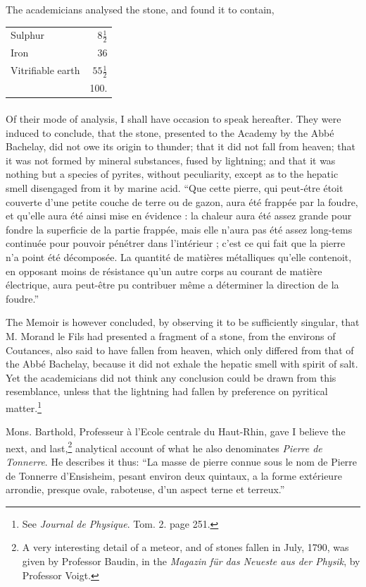 \documentclass[a4paper, 12pt, oneside, twocolumn]{article}
\begin{document}
The academicians analysed the stone, and found it to contain,
\begin{table}[H]
    \centering\bfseries
    \begin{tabular}{l r}
        Sulphur & $8\frac{1}{2}$ \\ 
        Iron & 36 \\
        Vitrifiable earth & $55\frac{1}{2}$ \\ \hline
        ~ & 100. \\
    \end{tabular}
\end{table}
\paragraph{}
Of their mode of analysis, I shall have occasion to speak hereafter. They were induced to conclude, that the stone, presented to the Academy by the Abbé Bachelay, did not owe its origin to thunder; that it did not fall from heaven; that it was not formed by mineral substances, fused by lightning; and that it was nothing but a species of pyrites, without peculiarity, except as to the hepatic smell disengaged from it by marine acid. ``Que cette pierre, qui peut-étre étoit couverte d'une petite couche de terre ou de gazon, aura été frappée par la foudre, et qu'elle aura été ainsi mise en évidence : la chaleur aura été assez grande pour fondre la superficie de la partie frappée, mais elle n'aura pas été assez long-tems continuée pour pouvoir pénétrer dans l'intérieur ; c'est ce qui fait que la pierre n'a point été décomposée. La quantité de matières métalliques qu'elle contenoit, en opposant moins de résistance qu'un autre corps au courant de matière électrique, aura peut-être pu contribuer même a déterminer la direction de la foudre.''

The Memoir is however concluded, by observing it to be sufficiently singular, that M. Morand le Fils had presented a fragment of a stone, from the environs of Coutances, also said to have fallen from heaven, which only differed from that of the Abbé Bachelay, because it did not exhale the hepatic smell with spirit of salt. Yet the academicians did not think any conclusion could be drawn from this resemblance, unless that the lightning had fallen by preference on pyritical matter.\footnote{See \emph{Journal de Physique}. Tom. 2. page 251.}

Mons. Barthold, Professeur à l'Ecole centrale du Haut-Rhin, gave I believe the next, and last,\footnote{A very interesting detail of a meteor, and of stones fallen in July, 1790, was given by Professor Baudin, in the \emph{Magazin für das Neueste aus der Physik}, by Professor Voigt.} analytical account of what he also denominates \emph{Pierre de Tonnerre}. He describes it thus: ``La masse de pierre connue sous le nom de Pierre de Tonnerre d'Ensisheim, pesant environ deux quintaux, a la forme extérieure arrondie, presque ovale, raboteuse, d'un aspect terne et terreux.''
\end{document}
